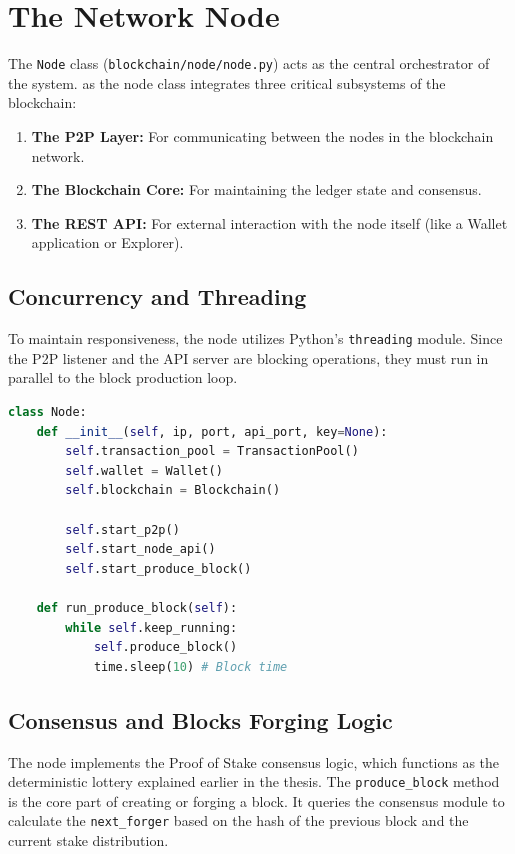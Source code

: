 \section{The Network Node} \label{ch4_node_impl}

The \texttt{Node} class (\texttt{blockchain/node/node.py}) acts as the central orchestrator of the system. as the node class integrates three critical subsystems of the blockchain:
\begin{enumerate}
    \item \textbf{The P2P Layer:} For communicating between the nodes in the blockchain network.
    \item \textbf{The Blockchain Core:} For maintaining the ledger state and consensus.
    \item \textbf{The REST API:} For external interaction with the node itself (like a Wallet application or Explorer).
\end{enumerate}

\newpage

\subsection{Concurrency and Threading}
To maintain responsiveness, the node utilizes Python's \texttt{threading} module. Since the P2P listener and the API server are blocking operations, they must run in parallel to the block production loop.

\begin{lstlisting}[language=Python, caption=Node Initialization and Threading, label=lst:node_init]
class Node:
    def __init__(self, ip, port, api_port, key=None):
        self.transaction_pool = TransactionPool()
        self.wallet = Wallet()
        self.blockchain = Blockchain()
        
        self.start_p2p()
        self.start_node_api()
        self.start_produce_block()

    def run_produce_block(self):
        while self.keep_running:
            self.produce_block()
            time.sleep(10) # Block time
\end{lstlisting}

\subsection{Consensus and Blocks Forging Logic}
The node implements the Proof of Stake consensus logic, which functions as the deterministic lottery explained earlier in the thesis. The \texttt{produce\_block} method is the core part of creating or forging a block. It queries the consensus module to calculate the \texttt{next\_forger} based on the hash of the previous block and the current stake distribution.

